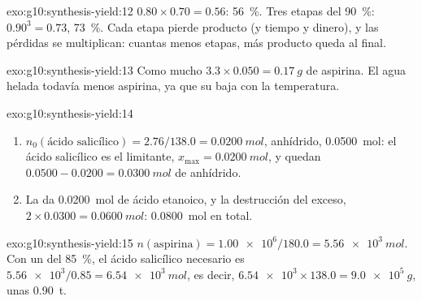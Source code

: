 \begin{solution}{exo:g10:synthesis-yield:12}
$0.80 \times 0.70 = 0.56$: \qty{56}{\percent}. Tres etapas del
\qty{90}{\percent}: $0.90^3 = 0.73$, \qty{73}{\percent}. Cada etapa
pierde producto (y tiempo y dinero), y las pérdidas se multiplican:
cuantas menos etapas, más producto queda al final.
\end{solution}

\begin{solution}{exo:g10:synthesis-yield:13}
Como mucho $3.3 \times 0.050 = \qty{0.17}{g}$ de aspirina. El agua
helada  todavía menos aspirina, ya que su  baja con
la temperatura.
\end{solution}

\begin{solution}{exo:g10:synthesis-yield:14}
\begin{enumerate}
  \item $n_0(\text{ácido salicílico}) = 2.76 / 138.0 = \qty{0.0200}{mol}$,
        anhídrido, \qty{0.0500}{mol}: el ácido salicílico es el
        limitante, $x_{\max} = \qty{0.0200}{mol}$, y quedan
        $0.0500 - 0.0200 =
        \qty{0.0300}{mol}$ de anhídrido.
  \item La  da \qty{0.0200}{mol} de ácido etanoico, y la
        destrucción del exceso, $2 \times 0.0300 = \qty{0.0600}{mol}$:
        \qty{0.0800}{mol} en total.
\end{enumerate}
\end{solution}

\begin{solution}{exo:g10:synthesis-yield:15}
$n(\text{aspirina}) = \num{1.00e6} / 180.0 = \qty{5.56e3}{mol}$. Con un
 del \qty{85}{\percent}, el ácido salicílico necesario es
$\num{5.56e3} / 0.85 = \qty{6.54e3}{mol}$, es decir,
$\num{6.54e3} \times 138.0 = \qty{9.0e5}{g}$, unas \qty{0.90}{t}.
\end{solution}

